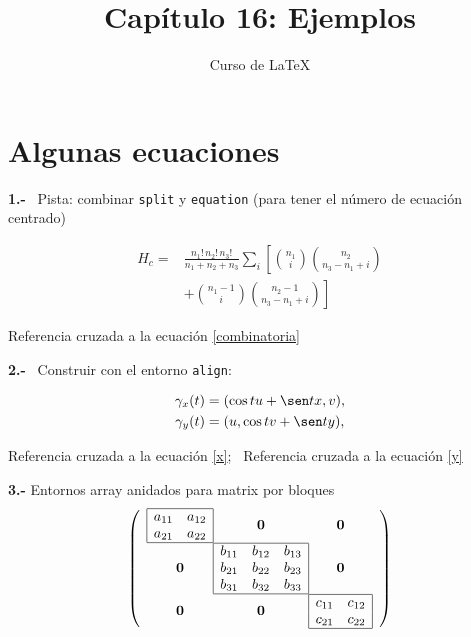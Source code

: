 \documentclass[a4paper,11pt]{article}
\title{Capítulo 16: Ejemplos}
\author{Curso de \LaTeX}
\date{}
\begin{document}
\maketitle



\section{Algunas ecuaciones}

\textbf{1.-} \ Pista: combinar \texttt{split} y \texttt{equation} 
(para tener el número de ecuación centrado)
 
\begin{equation}
\begin{split}
H_c=& \frac{n_1!\,n_2!\,n_3!}
{n_1+n_2+n_3}\sum_i\left[\binom{n_1}{i}
\binom{n_2}{n_3-n_1+i}\right.\\[1mm]
&+\left.\binom{n_1-1}{i} \binom{n_2-1}{n_3-n_1+i}\right]
\end{split}\label{combinatoria}
\end{equation}

\medskip
Referencia cruzada a la ecuación \eqref{combinatoria}

\bigskip

\textbf{2.-} \ Construir con el entorno \texttt{align}:

\begin{align}
\gamma_x(t)&=(\cos tu+\sen tx,v), \label{x} \\
\gamma_y(t)&=(u,\cos tv+\sen ty), \label{y} 
\end{align}

\medskip
Referencia cruzada a la ecuación \eqref{x}; \ 
Referencia cruzada a la ecuación \eqref{y}

\bigskip

\textbf{3.-}  Entornos array anidados para matrix por bloques
\begin{equation}\label{matriz}
\left(
\begin{array}{c@{}c@{}c}
 \begin{array}{|cc|}\hline
  a_{11} & a_{12} \\
  a_{21} & a_{22} \\\hline
 \end{array} & \mathbf{0} & \mathbf{0} \\
 \mathbf{0} &
 \begin{array}{|ccc|}\hline
  b_{11} & b_{12} & b_{13}\\
  b_{21} & b_{22} & b_{23}\\
  b_{31} & b_{32} & b_{33}\\\hline
 \end{array} & \mathbf{0} \\
 \mathbf{0} & \mathbf{0} &
 \begin{array}{|cc|}\hline
  c_{11} & c_{12} \\
  c_{21} & c_{22} \\\hline
 \end{array} \\
\end{array}
\right)
\end{equation}
\end{document}
